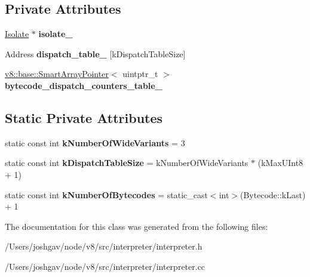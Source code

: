 \subsection*{Private Attributes}
\begin{DoxyCompactItemize}
\item 
\hyperlink{classv8_1_1internal_1_1_isolate}{Isolate} $\ast$ {\bfseries isolate\+\_\+}\hypertarget{classv8_1_1internal_1_1interpreter_1_1_interpreter_ab848cdee3a0627e094469c0ab156ee5d}{}\label{classv8_1_1internal_1_1interpreter_1_1_interpreter_ab848cdee3a0627e094469c0ab156ee5d}

\item 
Address {\bfseries dispatch\+\_\+table\+\_\+} \mbox{[}k\+Dispatch\+Table\+Size\mbox{]}\hypertarget{classv8_1_1internal_1_1interpreter_1_1_interpreter_a7f886370daf263cb4d1cd2265b60ef4e}{}\label{classv8_1_1internal_1_1interpreter_1_1_interpreter_a7f886370daf263cb4d1cd2265b60ef4e}

\item 
\hyperlink{classv8_1_1base_1_1_smart_array_pointer}{v8\+::base\+::\+Smart\+Array\+Pointer}$<$ uintptr\+\_\+t $>$ {\bfseries bytecode\+\_\+dispatch\+\_\+counters\+\_\+table\+\_\+}\hypertarget{classv8_1_1internal_1_1interpreter_1_1_interpreter_a348cc153ed6b0f89ae8058f42a16dcc0}{}\label{classv8_1_1internal_1_1interpreter_1_1_interpreter_a348cc153ed6b0f89ae8058f42a16dcc0}

\end{DoxyCompactItemize}
\subsection*{Static Private Attributes}
\begin{DoxyCompactItemize}
\item 
static const int {\bfseries k\+Number\+Of\+Wide\+Variants} = 3\hypertarget{classv8_1_1internal_1_1interpreter_1_1_interpreter_a1c47f200d4d767c804886b7cc2cec917}{}\label{classv8_1_1internal_1_1interpreter_1_1_interpreter_a1c47f200d4d767c804886b7cc2cec917}

\item 
static const int {\bfseries k\+Dispatch\+Table\+Size} = k\+Number\+Of\+Wide\+Variants $\ast$ (k\+Max\+U\+Int8 + 1)\hypertarget{classv8_1_1internal_1_1interpreter_1_1_interpreter_a9c1478cb376d617c1c41756a68eb6833}{}\label{classv8_1_1internal_1_1interpreter_1_1_interpreter_a9c1478cb376d617c1c41756a68eb6833}

\item 
static const int {\bfseries k\+Number\+Of\+Bytecodes} = static\+\_\+cast$<$int$>$(Bytecode\+::k\+Last) + 1\hypertarget{classv8_1_1internal_1_1interpreter_1_1_interpreter_a747722cbffe40bc359d5468f1be1ee10}{}\label{classv8_1_1internal_1_1interpreter_1_1_interpreter_a747722cbffe40bc359d5468f1be1ee10}

\end{DoxyCompactItemize}


The documentation for this class was generated from the following files\+:\begin{DoxyCompactItemize}
\item 
/\+Users/joshgav/node/v8/src/interpreter/interpreter.\+h\item 
/\+Users/joshgav/node/v8/src/interpreter/interpreter.\+cc\end{DoxyCompactItemize}
